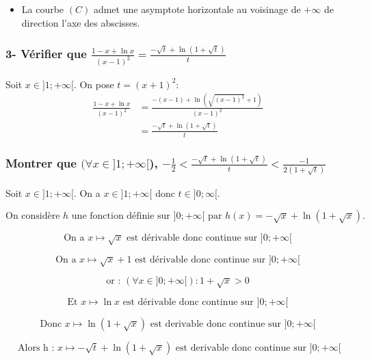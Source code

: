\documentclass{article}
\begin{document}
\begin{itemize}
    \item La courbe \( (C) \) admet une asymptote horizontale au voisinage de \( +\infty \) de direction l'axe des abscisses.
\end{itemize}

\hrulefill %

\subsubsection*{3- Vérifier que \( \frac{ 1- x +\ln x}{(x-1)^2} = \frac{-\sqrt{t} + \ln(1+\sqrt{t})}{t} \)}

Soit \(x \in ]1;+\infty[\). On pose \(t = (x+1)^2 \):
\begin{align*}
    \frac{1-x + \ln x}{(x-1)^2} &= \frac{-(x-1) + \ln(\sqrt{(x-1)^2} + 1)}{(x-1)^2} \\
    &= \frac{-\sqrt{t} + \ln(1 + \sqrt{t})}{t}
\end{align*}

\hrulefill %

\subsubsection*{Montrer que \(( \forall x \in ] 1 ; +\infty [ \)), \(-\frac{1}{2} < \frac{-\sqrt{t} + \ln(1 + \sqrt{t})}{t} < \frac{-1}{2(1+\sqrt{t})} \)}

Soit \(x \in ]1; +\infty[ \). On a \(x \in ] 1; +\infty [\) donc \(t \in ]0 ; \infty[ \).

\[
\text{On considère } h \text{ une fonction définie sur } ]0; +\infty[ \text{ par } h(x) = -\sqrt{x} + \ln(1 + \sqrt{x}).
\]

\[
\text{On a } x \mapsto \sqrt{x} \text{ est dérivable donc continue sur } ]0 ; +\infty [
\]

\[
\text{On a } x \mapsto \sqrt{x} + 1 \text{ est dérivable donc continue sur } ]0 ; +\infty [ 
\]

\[
\text{or : } (\forall x \in ]0 ; +\infty[) : 1+\sqrt{x} > 0
\]

\[
\text{Et } x \mapsto \ln x \text{ est dérivable donc continue sur } ]0 ; +\infty [ 
\]

\[
\text{Donc } x \mapsto \ln(1+\sqrt{x}) \text{ est derivable donc continue sur } ] 0 ; + \infty [
\]

\[
\text { Alors h : } x \mapsto - \sqrt{t}+\ln(1+\sqrt{x}) \text{ est derivable donc continue sur } ] 0 ; +\infty [
\]
\end{document}
